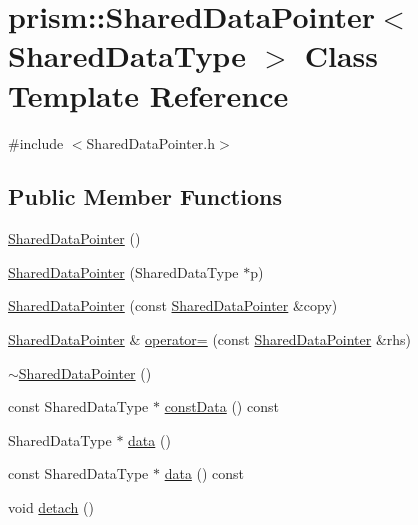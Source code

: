 \hypertarget{classprism_1_1_shared_data_pointer}{}\section{prism\+:\+:Shared\+Data\+Pointer$<$ Shared\+Data\+Type $>$ Class Template Reference}
\label{classprism_1_1_shared_data_pointer}


{\ttfamily \#include $<$Shared\+Data\+Pointer.\+h$>$}

\subsection*{Public Member Functions}
\begin{DoxyCompactItemize}
\item 
\hyperlink{classprism_1_1_shared_data_pointer_aae89ba1520cd16d5d6efc06c3c763a57}{Shared\+Data\+Pointer} ()
\item 
\hyperlink{classprism_1_1_shared_data_pointer_a8f33e2be524ada8415b31533876f7a4d}{Shared\+Data\+Pointer} (Shared\+Data\+Type $\ast$p)
\item 
\hyperlink{classprism_1_1_shared_data_pointer_a3e8fb06e78156d0341984e8ef4002f6e}{Shared\+Data\+Pointer} (const \hyperlink{classprism_1_1_shared_data_pointer}{Shared\+Data\+Pointer} \&copy)
\item 
\hyperlink{classprism_1_1_shared_data_pointer}{Shared\+Data\+Pointer} \& \hyperlink{classprism_1_1_shared_data_pointer_a1e683956ccbe47d262c92f934d04f254}{operator=} (const \hyperlink{classprism_1_1_shared_data_pointer}{Shared\+Data\+Pointer} \&rhs)
\item 
\hyperlink{classprism_1_1_shared_data_pointer_a0c2b49901e71a8d43a0b34685653032c}{$\sim$\+Shared\+Data\+Pointer} ()
\item 
const Shared\+Data\+Type $\ast$ \hyperlink{classprism_1_1_shared_data_pointer_a4748e8c520ac7cc9d73d2c763cbad7fb}{const\+Data} () const 
\item 
Shared\+Data\+Type $\ast$ \hyperlink{classprism_1_1_shared_data_pointer_ae0acea5732c353a5ce4afb54c07e7302}{data} ()
\item 
const Shared\+Data\+Type $\ast$ \hyperlink{classprism_1_1_shared_data_pointer_a2d6b477eed9cb60c0197cce0361f37cd}{data} () const 
\item 
void \hyperlink{classprism_1_1_shared_data_pointer_aa222b261cf3a1ef3c36affa1ae6eda3a}{detach} ()
\item 

\end{DoxyCompactItemize}
